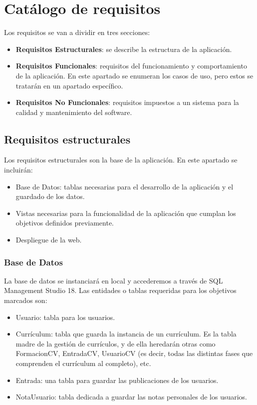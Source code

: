 \section{Catálogo de requisitos}
Los requisitos se van a dividir en tres secciones:
\begin{itemize}
\tightlist
 \item \textbf{Requisitos Estructurales}: se describe la estructura de la aplicación.
 \item \textbf{Requisitos Funcionales}: requisitos del funcionamiento y comportamiento
 de la aplicación. En este apartado se enumeran los casos de uso, pero estos se tratarán en un
 apartado específico.
 \item \textbf{Requisitos No Funcionales}: requisitos impuestos a un sistema para la calidad
 y mantenimiento del software.
\end{itemize}

\subsection{Requisitos estructurales}
Los requisitos estructurales son la base de la aplicación. En este apartado se incluirán:
\begin{itemize}
\tightlist
 \item Base de Datos: tablas necesarias para el desarrollo de la aplicación y el guardado de los datos.
 \item Vistas necesarias para la funcionalidad de la aplicación que cumplan los objetivos definidos previamente.
 \item Despliegue de la web.
\end{itemize}

\subsubsection{Base de Datos}
La base de datos se instanciará en local y accederemos a través de SQL Management Studio 18. Las entidades o tablas requeridas para los objetivos marcados son:
\begin{itemize}
 \item Usuario: tabla para los usuarios.
 \item Currículum: tabla que guarda la instancia de un currículum. Es la tabla madre de la gestión de currículos, y de ella heredarán otras como FormacionCV, EntradaCV, UsuarioCV (es decir, todas las distintas fases que comprenden el currículum al completo), etc.
 \item Entrada: una tabla para guardar las publicaciones de los usuarios.
 \item NotaUsuario: tabla dedicada a guardar las notas personales de los usuarios.
\end{itemize}

